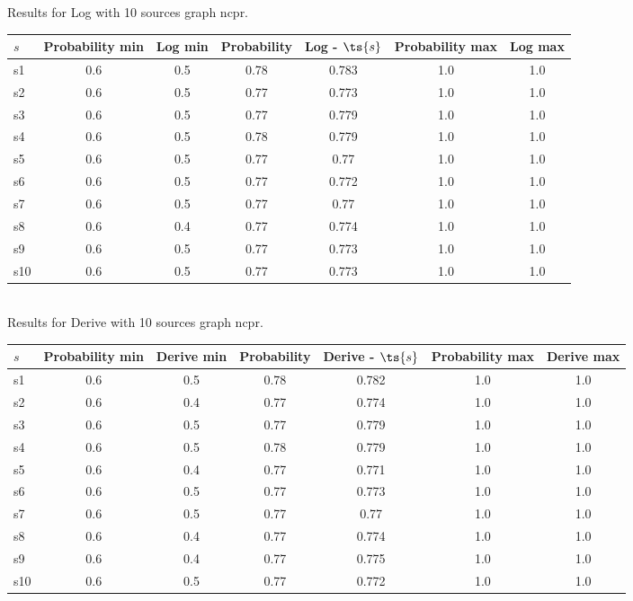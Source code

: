 \documentclass{article}
\begin{document}
\noindent Results for Log with 10 sources graph ncpr.

\noindent\begin{tabular}{|l|c|c|c|c|c|c|}
\hline
$s$& Probability min & Log min & Probability & Log - $\ts{s}$ & Probability max & Log max\\
\hline
s1 &0.6 & 0.5 & 0.78 & 0.783 & 1.0 & 1.0\\
\hline
s2 &0.6 & 0.5 & 0.77 & 0.773 & 1.0 & 1.0\\
\hline
s3 &0.6 & 0.5 & 0.77 & 0.779 & 1.0 & 1.0\\
\hline
s4 &0.6 & 0.5 & 0.78 & 0.779 & 1.0 & 1.0\\
\hline
s5 &0.6 & 0.5 & 0.77 & 0.77 & 1.0 & 1.0\\
\hline
s6 &0.6 & 0.5 & 0.77 & 0.772 & 1.0 & 1.0\\
\hline
s7 &0.6 & 0.5 & 0.77 & 0.77 & 1.0 & 1.0\\
\hline
s8 &0.6 & 0.4 & 0.77 & 0.774 & 1.0 & 1.0\\
\hline
s9 &0.6 & 0.5 & 0.77 & 0.773 & 1.0 & 1.0\\
\hline
s10 &0.6 & 0.5 & 0.77 & 0.773 & 1.0 & 1.0\\
\hline
\end{tabular}\\

\noindent Results for Derive with 10 sources graph ncpr.

\noindent\begin{tabular}{|l|c|c|c|c|c|c|}
\hline
$s$& Probability min & Derive min & Probability & Derive - $\ts{s}$ & Probability max & Derive max\\
\hline
s1 &0.6 & 0.5 & 0.78 & 0.782 & 1.0 & 1.0\\
\hline
s2 &0.6 & 0.4 & 0.77 & 0.774 & 1.0 & 1.0\\
\hline
s3 &0.6 & 0.5 & 0.77 & 0.779 & 1.0 & 1.0\\
\hline
s4 &0.6 & 0.5 & 0.78 & 0.779 & 1.0 & 1.0\\
\hline
s5 &0.6 & 0.4 & 0.77 & 0.771 & 1.0 & 1.0\\
\hline
s6 &0.6 & 0.5 & 0.77 & 0.773 & 1.0 & 1.0\\
\hline
s7 &0.6 & 0.5 & 0.77 & 0.77 & 1.0 & 1.0\\
\hline
s8 &0.6 & 0.4 & 0.77 & 0.774 & 1.0 & 1.0\\
\hline
s9 &0.6 & 0.4 & 0.77 & 0.775 & 1.0 & 1.0\\
\hline
s10 &0.6 & 0.5 & 0.77 & 0.772 & 1.0 & 1.0\\
\hline
\end{tabular}\\
\end{document}
